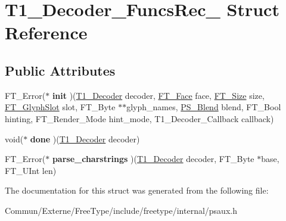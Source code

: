 \hypertarget{struct_t1___decoder___funcs_rec__}{}\section{T1\+\_\+\+Decoder\+\_\+\+Funcs\+Rec\+\_\+ Struct Reference}
\label{struct_t1___decoder___funcs_rec__}
\subsection*{Public Attributes}
\begin{DoxyCompactItemize}
\item 
F\+T\+\_\+\+Error($\ast$ {\bfseries init} )(\hyperlink{struct_t1___decoder_rec__}{T1\+\_\+\+Decoder} decoder, \hyperlink{struct_f_t___face_rec__}{F\+T\+\_\+\+Face} face, \hyperlink{struct_f_t___size_rec__}{F\+T\+\_\+\+Size} size, \hyperlink{struct_f_t___glyph_slot_rec__}{F\+T\+\_\+\+Glyph\+Slot} slot, F\+T\+\_\+\+Byte $\ast$$\ast$glyph\+\_\+names, \hyperlink{struct_p_s___blend_rec__}{P\+S\+\_\+\+Blend} blend, F\+T\+\_\+\+Bool hinting, F\+T\+\_\+\+Render\+\_\+\+Mode hint\+\_\+mode, T1\+\_\+\+Decoder\+\_\+\+Callback callback)\hypertarget{struct_t1___decoder___funcs_rec___ac6c6d5e56e3413bdb3802668e4ce3de7}{}\label{struct_t1___decoder___funcs_rec___ac6c6d5e56e3413bdb3802668e4ce3de7}

\item 
void($\ast$ {\bfseries done} )(\hyperlink{struct_t1___decoder_rec__}{T1\+\_\+\+Decoder} decoder)\hypertarget{struct_t1___decoder___funcs_rec___a766b605fd0a10755d9ce14d2bfea3bc5}{}\label{struct_t1___decoder___funcs_rec___a766b605fd0a10755d9ce14d2bfea3bc5}

\item 
F\+T\+\_\+\+Error($\ast$ {\bfseries parse\+\_\+charstrings} )(\hyperlink{struct_t1___decoder_rec__}{T1\+\_\+\+Decoder} decoder, F\+T\+\_\+\+Byte $\ast$base, F\+T\+\_\+\+U\+Int len)\hypertarget{struct_t1___decoder___funcs_rec___acef414b0ecbec6da63a11c1d94fb7c3e}{}\label{struct_t1___decoder___funcs_rec___acef414b0ecbec6da63a11c1d94fb7c3e}

\end{DoxyCompactItemize}


The documentation for this struct was generated from the following file\+:\begin{DoxyCompactItemize}
\item 
Commun/\+Externe/\+Free\+Type/include/freetype/internal/psaux.\+h\end{DoxyCompactItemize}
